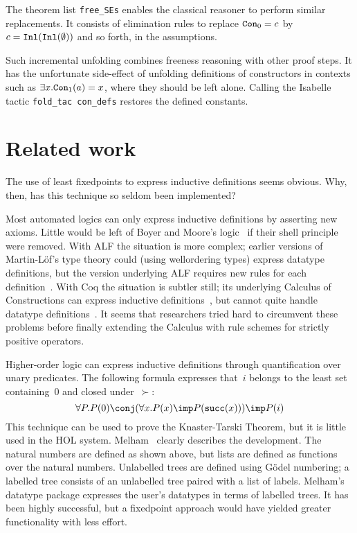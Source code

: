 The theorem list \verb|free_SEs| enables the classical
reasoner to perform similar replacements.  It consists of elimination rules
to replace $\hbox{\tt Con}_0=c$ by $c=\hbox{\tt Inl}(\hbox{\tt Inl}(\emptyset))$ and so forth, in the
assumptions.

Such incremental unfolding combines freeness reasoning with other proof
steps.  It has the unfortunate side-effect of unfolding definitions of
constructors in contexts such as $\exists x.\hbox{\tt Con}_1(a)=x$, where they should
be left alone.  Calling the Isabelle tactic {\tt fold\_tac con\_defs}
restores the defined constants.
\fi  %

\section{Related work}\label{related}
The use of least fixedpoints to express inductive definitions seems
obvious.  Why, then, has this technique so seldom been implemented?

Most automated logics can only express inductive definitions by asserting
new axioms.  Little would be left of Boyer and Moore's logic~\cite{bm79} if
their shell principle were removed.  With ALF the situation is more
complex; earlier versions of Martin-L\"of's type theory could (using
wellordering types) express datatype definitions, but the version
underlying ALF requires new rules for each definition~\cite{dybjer91}.
With Coq the situation is subtler still; its underlying Calculus of
Constructions can express inductive definitions~\cite{huet88}, but cannot
quite handle datatype definitions~\cite{paulin92}.  It seems that
researchers tried hard to circumvent these problems before finally
extending the Calculus with rule schemes for strictly positive operators.

Higher-order logic can express inductive definitions through quantification
over unary predicates.  The following formula expresses that~$i$ belongs to the
least set containing~0 and closed under~$\succ$:
\[ \forall P. P(0)\conj (\forall x.P(x)\imp P(\succ(x))) \imp P(i) \] 
This technique can be used to prove the Knaster-Tarski Theorem, but it is
little used in the HOL system.  Melham~\cite{melham89} clearly describes
the development.  The natural numbers are defined as shown above, but lists
are defined as functions over the natural numbers.  Unlabelled
trees are defined using G\"odel numbering; a labelled tree consists of an
unlabelled tree paired with a list of labels.  Melham's datatype package
expresses the user's datatypes in terms of labelled trees.  It has been
highly successful, but a fixedpoint approach would have yielded greater
functionality with less effort.


